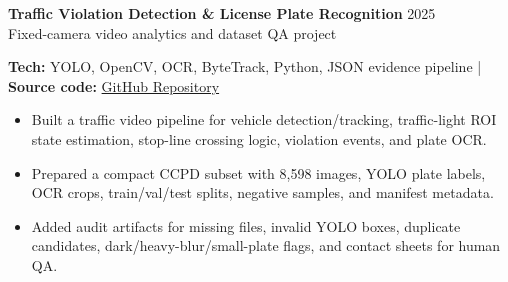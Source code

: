 \documentclass[10pt,a4paper]{article}
\newcommand{\cvproject}[3]{%
  \textbf{#1} \hfill {\small\color{muted}#2}\\
  {\small\color{muted}#3}
}
\newcommand{\techline}[2]{%
  {\small\textbf{Tech:} #1 \quad | \quad \textbf{Source code:} \href{#2}{GitHub Repository}}\\[-2pt]
}
\begin{document}
\cvproject
  {Traffic Violation Detection \& License Plate Recognition}
  {2025}
  {Fixed-camera video analytics and dataset QA project}
\techline{YOLO, OpenCV, OCR, ByteTrack, Python, JSON evidence pipeline}{https://github.com/NguyenKhacBao564/Traffic-Violation-Detection-and-License-Plate-Recognition.git}
\begin{itemize}
  \item Built a traffic video pipeline for vehicle detection/tracking, traffic-light ROI state estimation, stop-line crossing logic, violation events, and plate OCR.
  \item Prepared a compact CCPD subset with 8,598 images, YOLO plate labels, OCR crops, train/val/test splits, negative samples, and manifest metadata.
  \item Added audit artifacts for missing files, invalid YOLO boxes, duplicate candidates, dark/heavy-blur/small-plate flags, and contact sheets for human QA.
\end{itemize}
\end{document}
